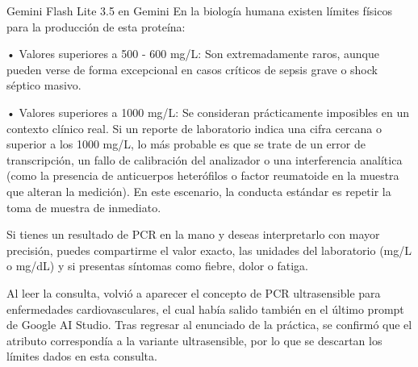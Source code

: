 \documentclass[12pt,a4paper,oneside]{book}
\begin{document}
\begin{iaresp}{Gemini Flash Lite 3.5 en Gemini}
En la biología humana existen límites físicos para la producción de esta proteína:

• Valores superiores a 500 - 600 mg/L: Son extremadamente raros, aunque pueden verse de forma excepcional en casos críticos de sepsis grave o shock séptico masivo.

• Valores superiores a 1000 mg/L: Se consideran prácticamente imposibles en un contexto clínico real. Si un reporte de laboratorio indica una cifra cercana o superior a los 1000 mg/L, lo más probable es que se trate de un error de transcripción, un fallo de calibración del analizador o una interferencia analítica (como la presencia de anticuerpos heterófilos o factor reumatoide en la muestra que alteran la medición). En este escenario, la conducta estándar es repetir la toma de muestra de inmediato.

Si tienes un resultado de PCR en la mano y deseas interpretarlo con mayor precisión, puedes compartirme el valor exacto, las unidades del laboratorio (mg/L o mg/dL) y si presentas síntomas como fiebre, dolor o fatiga.
\end{iaresp}
\begin{iaanalisis}
Al leer la consulta, volvió a aparecer el concepto de PCR ultrasensible para enfermedades cardiovasculares, el cual había salido también en el último prompt de Google AI Studio. Tras regresar al enunciado de la práctica, se confirmó que el atributo correspondía a la variante ultrasensible, por lo que se descartan los límites dados en esta consulta.
\end{iaanalisis}
\end{document}
